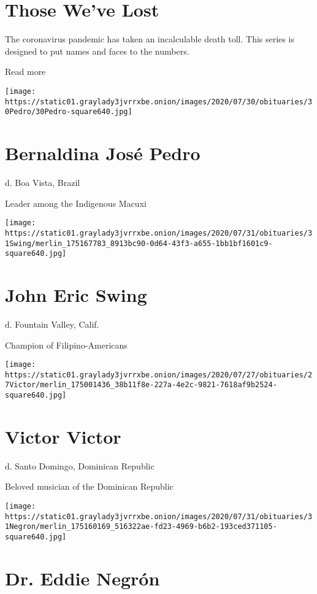 \hypertarget{those-weve-lost}{%
\section{Those We've Lost}\label{those-weve-lost}}

The coronavirus pandemic has taken an incalculable death toll. This
series is designed to put names and faces to the numbers.

Read more

\texttt{[image: https://static01.graylady3jvrrxbe.onion/images/2020/07/30/obituaries/30Pedro/30Pedro-square640.jpg]}

\hypertarget{bernaldina-josuxe9-pedro}{%
\section{Bernaldina José Pedro}\label{bernaldina-josuxe9-pedro}}

d. Boa Vista, Brazil

Leader among the Indigenous Macuxi

\texttt{[image: https://static01.graylady3jvrrxbe.onion/images/2020/07/31/obituaries/31Swing/merlin\_175167783\_8913bc90-0d64-43f3-a655-1bb1bf1601c9-square640.jpg]}

\hypertarget{john-eric-swing}{%
\section{John Eric Swing}\label{john-eric-swing}}

d. Fountain Valley, Calif.

Champion of Filipino-Americans

\texttt{[image: https://static01.graylady3jvrrxbe.onion/images/2020/07/27/obituaries/27Victor/merlin\_175001436\_38b11f8e-227a-4e2c-9821-7618af9b2524-square640.jpg]}

\hypertarget{victor-victor}{%
\section{Victor Victor}\label{victor-victor}}

d. Santo Domingo, Dominican Republic

Beloved musician of the Dominican Republic

\texttt{[image: https://static01.graylady3jvrrxbe.onion/images/2020/07/31/obituaries/31Negron/merlin\_175160169\_516322ae-fd23-4969-b6b2-193ced371105-square640.jpg]}

\hypertarget{dr-eddie-negruxf3n}{%
\section{Dr. Eddie Negrón}\label{dr-eddie-negruxf3n}}

